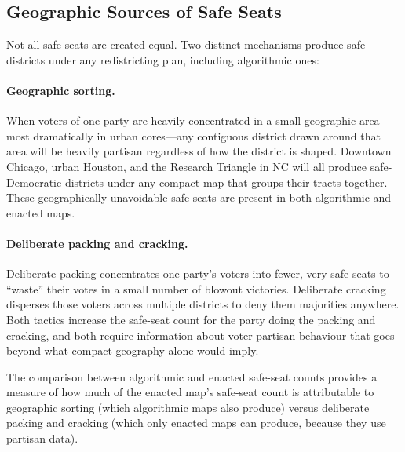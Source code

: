 \subsection{Geographic Sources of Safe Seats}

Not all safe seats are created equal. Two distinct mechanisms produce safe districts
under any redistricting plan, including algorithmic ones:

\paragraph{Geographic sorting.}
When voters of one party are heavily concentrated in a small geographic area---most
dramatically in urban cores---any contiguous district drawn around that area will be
heavily partisan regardless of how the district is shaped. Downtown Chicago, urban
Houston, and the Research Triangle in NC will all produce safe-Democratic districts
under any compact map that groups their tracts together. These geographically
unavoidable safe seats are present in both algorithmic and enacted maps.

\paragraph{Deliberate packing and cracking.}
Deliberate packing concentrates one party's voters into fewer, very safe seats to
``waste'' their votes in a small number of blowout victories. Deliberate cracking
disperses those voters across multiple districts to deny them majorities anywhere.
Both tactics increase the safe-seat count for the party doing the packing and cracking,
and both require information about voter partisan behaviour that goes beyond what compact
geography alone would imply.

The comparison between algorithmic and enacted safe-seat counts provides a measure of
how much of the enacted map's safe-seat count is attributable to geographic sorting
(which algorithmic maps also produce) versus deliberate packing and cracking (which only
enacted maps can produce, because they use partisan data).
